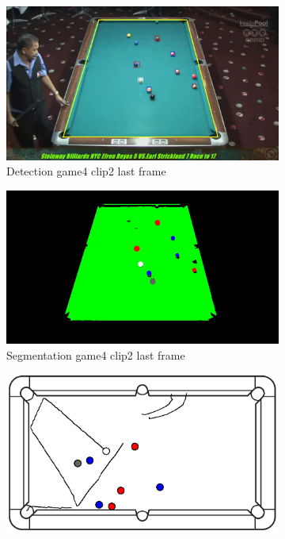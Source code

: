 \begin{figure}[H]
\begin{subfigure}[b]{0.48\textwidth}
        \centering
        \includegraphics[width=\textwidth]{images/Detection/game4_clip2_detected_balls_last_frame.jpg}
        \caption{Detection game4 clip2 last frame}
        \label{fig: game4_clip2_last_frame_detected}
    \end{subfigure}
    \begin{subfigure}[b]{0.48\textwidth}
        \centering
        \includegraphics[width=\textwidth]{images/Segmentation/game4_clip2_segmented_balls_last_frame.jpg}
        \caption{Segmentation game4 clip2 last frame}
		\label{fig: game4_clip2_last_frame_segmented}
    \end{subfigure}
    \begin{subfigure}[b]{0.48\textwidth}
    	\centering
    	\includegraphics[width=\textwidth]{images/AllMinimap/game4_clip2_minimap.png}

\end{subfigure}
\end{figure}
